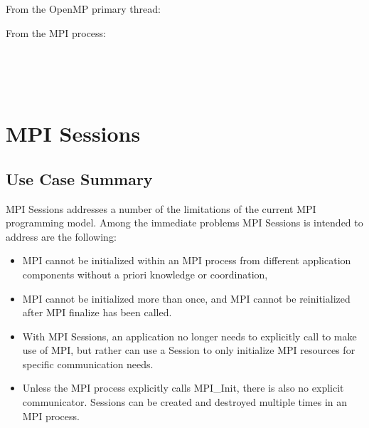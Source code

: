 
From the OpenMP primary thread:


From the MPI process:



{\large {}}

{\large {}}



 \\
 \\
 \\

\section{MPI Sessions}
\label{app:uc-MPI-sessions}

\subsection{Use Case Summary}
MPI Sessions addresses a number of the limitations of the current MPI programming model. Among the immediate problems MPI Sessions is intended to address are the following:

\begin{itemize}
\item MPI cannot be initialized within an MPI process from different application components without a priori knowledge or coordination,
\item MPI cannot be initialized more than once, and MPI cannot be reinitialized after MPI finalize has been called.
\item With MPI Sessions, an application no longer needs to explicitly call  to make use of MPI, but rather can use a Session to only initialize MPI resources for specific communication needs.
\item Unless the MPI process explicitly calls MPI_Init, there is also no explicit  communicator. Sessions can be created and destroyed multiple times in an MPI process.
\end{itemize}

